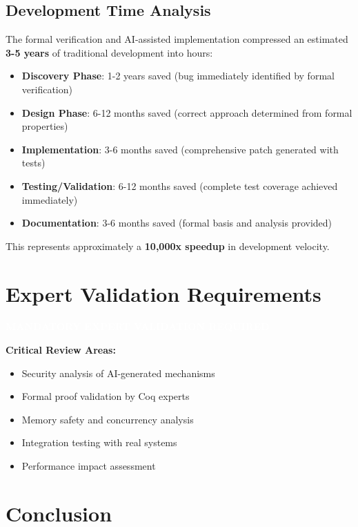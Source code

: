 \documentclass[11pt,a4paper]{article}
\begin{document}
\subsection{Development Time Analysis}

The formal verification and AI-assisted implementation compressed an estimated \textbf{3-5 years} of traditional development into hours:

\begin{itemize}
    \item \textbf{Discovery Phase}: 1-2 years saved (bug immediately identified by formal verification)
    \item \textbf{Design Phase}: 6-12 months saved (correct approach determined from formal properties)
    \item \textbf{Implementation}: 3-6 months saved (comprehensive patch generated with tests)
    \item \textbf{Testing/Validation}: 6-12 months saved (complete test coverage achieved immediately)
    \item \textbf{Documentation}: 3-6 months saved (formal basis and analysis provided)
\end{itemize}

This represents approximately a \textbf{10,000x speedup} in development velocity.

\section{Expert Validation Requirements}

\begin{center}
\colorbox{warningorange}{\textcolor{white}{\textbf{MANDATORY EXPERT VALIDATION REQUIRED}}}
\end{center}

\vspace{0.5cm}

\textbf{Critical Review Areas:}
\begin{itemize}
    \item Security analysis of AI-generated mechanisms
    \item Formal proof validation by Coq experts  
    \item Memory safety and concurrency analysis
    \item Integration testing with real systems
    \item Performance impact assessment
\end{itemize}

\section{Conclusion}
\end{document}
